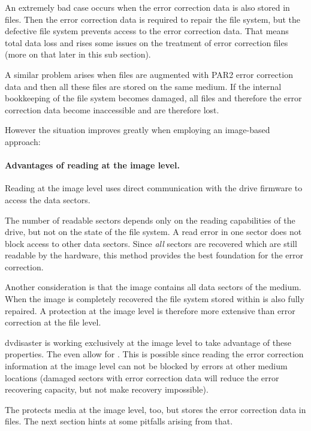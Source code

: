 An extremely bad case occurs when the error correction data is also stored in 
files. Then the error correction data is required to repair the file system, 
but the defective file system prevents access to the error correction data. 
That means total data loss and rises some issues on 
the treatment of error correction files (more on that later in this sub section).

A similar problem arises when files are augmented with PAR2 error correction 
data and then all these files are stored on the same medium. If the internal 
bookkeeping of the file system becomes damaged, all files and therefore the 
error correction data become inaccessible and are therefore lost.

\smallskip

However the situation improves greatly when employing an image-based approach:

\paragraph{Advantages of reading at the image level.} Reading at the image level 
uses direct communication with the drive firmware to access the data sectors.

The number of readable sectors depends only on the reading capabilities of the drive, 
but not on the state of the file system. A read error in one sector does not 
block access to other data sectors. Since {\em all} sectors are recovered 
which are still readable by the hardware, this method provides the best foundation 
for the error correction.

Another consideration is that the image contains all data sectors of 
the medium. When the image is completely 
recovered the file system stored within is also fully repaired. A protection 
at the image level is therefore more extensive than error correction at the file level.

dvdisaster is working exclusively at the image level to take advantage of these properties. 
The  even allow 
for . 
This is possible since reading the error correction information at the image level 
can not be blocked by errors at other medium locations (damaged sectors with error 
correction data will reduce the error recovering capacity, but not make recovery impossible).

\smallskip

The  protects media at the image level, too, 
but stores the error correction data in files. The next section hints at some pitfalls 
arising from that.


